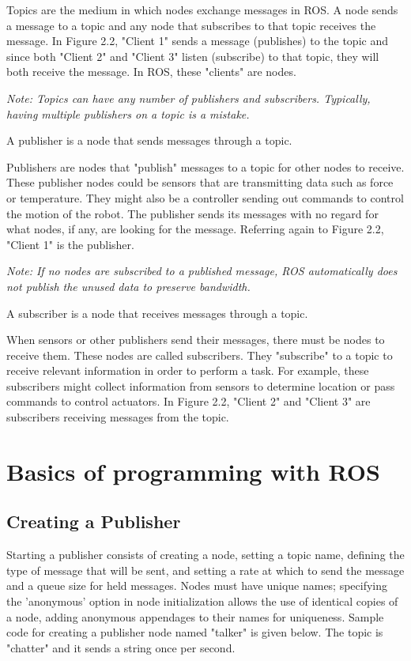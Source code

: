 \documentclass[twoside]{article}
\begin{document}
Topics are the medium in which nodes exchange messages in ROS. A node sends a message to a topic and any node that subscribes to that topic receives the message. In Figure 2.2, "Client 1" sends a message (publishes) to the topic and since both "Client 2" and "Client 3" listen (subscribe) to that topic, they will both receive the message. In ROS, these "clients" are nodes.

{\it Note: Topics can have any number of publishers and subscribers. Typically, having multiple publishers on a topic is a mistake.} \\

\begin{frm-def}[Publisher]
A publisher is a node that sends messages through a topic.
\end{frm-def}

Publishers are nodes that "publish" messages to a topic for other nodes to receive. These publisher nodes could be sensors that are transmitting data such as force or temperature. They might also be a controller sending out commands to control the motion of the robot. The publisher sends its messages with no regard for what nodes, if any, are looking for the message. Referring again to Figure 2.2, "Client 1" is the publisher.

{\it Note: If no nodes are subscribed to a published message, ROS automatically does not publish the unused data to preserve bandwidth.} \\

\begin{frm-def}[Subscriber]
A subscriber is a node that receives messages through a topic. 
\end{frm-def}

When sensors or other publishers send their messages, there must be nodes to receive them. These nodes are called subscribers. They "subscribe" to a topic to receive relevant information in order to perform a task. For example, these subscribers might collect information from sensors to determine location or pass commands to control actuators. In Figure 2.2, "Client 2" and "Client 3" are subscribers receiving messages from the topic.\\

\section{Basics of programming with ROS}
\subsection{Creating a Publisher}
Starting a publisher consists of creating a node, setting a topic name, defining the type of message that will be sent, and setting a rate at which to send the message and a queue size for held messages. Nodes must have unique names; specifying the 'anonymous' option in node initialization allows the use of identical copies of a node, adding anonymous appendages to their names for uniqueness. 
Sample code for creating a publisher node named "talker" is given below. The topic is "chatter" and it sends a string once per second. 
\end{document}
